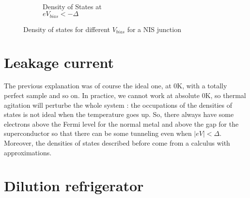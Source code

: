 \begin{figure}
\begin{subfigure}[t]{0.30\textwidth}
                \label{DOSNIS+}
                \end{subfigure}
                ~
                \begin{subfigure}[t]{0.30\textwidth}
                \centering
                \caption{Density of States at\\$eV_{bias}<-\Delta$}
                \label{DOSNIS-}
                \end{subfigure}
                \caption{Density of states for different $V_{bias}$ for a NIS junction}
                \label{DOSNIS}
        \end{figure}
        
        
        
        \section{Leakage current}
        
        The previous explanation was of course the ideal one, at 0K, with a totally perfect sample and so on. In practice, we cannot work at absolute 0K, so thermal agitation will perturbe the whole system : the occupations of the densities of states is not ideal when the temperature goes up. So, there always have some electrons above the Fermi level for the normal metal and above the gap for the superconductor so that there can be some tunneling even when $|eV|<\Delta$.
        Moreover, the densities of states described before come from a calculus with approximations.
        
        \section{Dilution refrigerator}
        
        
        
